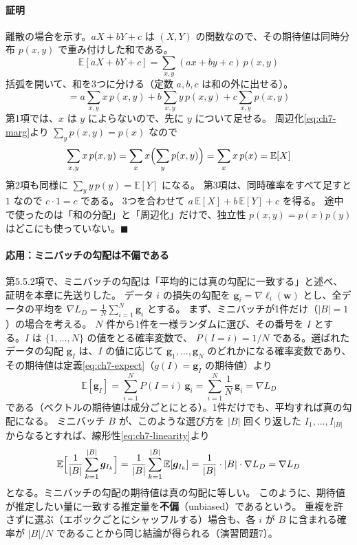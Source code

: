 \paragraph{証明}
離散の場合を示す。$aX + bY + c$ は $(X, Y)$ の関数なので、その期待値は同時分布 $p(x, y)$ で重み付けした和である。
\begin{equation*}
  \mathbb{E}[aX + bY + c] = \sum_{x, y} (ax + by + c)\,p(x, y)
\end{equation*}
括弧を開いて、和を3つに分ける（定数 $a, b, c$ は和の外に出せる）。
\begin{equation*}
  = a \sum_{x, y} x\,p(x, y) + b \sum_{x, y} y\,p(x, y) + c \sum_{x, y} p(x, y)
\end{equation*}
第1項では、$x$ は $y$ によらないので、先に $y$ について足せる。
周辺化\eqref{eq:ch7-marg}より $\sum_y p(x, y) = p(x)$ なので
\begin{equation*}
  \sum_{x, y} x\,p(x, y) = \sum_x x \Bigl( \sum_y p(x, y) \Bigr) = \sum_x x\,p(x) = \mathbb{E}[X]
\end{equation*}
第2項も同様に $\sum_y y\,p(y) = \mathbb{E}[Y]$ になる。
第3項は、同時確率をすべて足すと $1$ なので $c \cdot 1 = c$ である。
3つを合わせて $a\,\mathbb{E}[X] + b\,\mathbb{E}[Y] + c$ を得る。
途中で使ったのは「和の分配」と「周辺化」だけで、独立性 $p(x, y) = p(x)p(y)$ はどこにも使っていない。\hfill $\blacksquare$

\paragraph{応用：ミニバッチの勾配は不偏である}
第5.5.2項で、ミニバッチの勾配は「平均的には真の勾配に一致する」と述べ、証明を本章に先送りした。
データ $i$ の損失の勾配を $\bm{g}_i = \nabla\ell_i(\bm{w})$ とし、全データの平均を $\nabla L_D = \frac{1}{N}\sum_{i=1}^N \bm{g}_i$ とする。
まず、ミニバッチが1件だけ（$|B| = 1$）の場合を考える。
$N$ 件から1件を一様ランダムに選び、その番号を $I$ とする。$I$ は $\{1, \ldots, N\}$ の値をとる確率変数で、
$P(I = i) = 1/N$ である。選ばれたデータの勾配 $\bm{g}_I$ は、$I$ の値に応じて $\bm{g}_1, \ldots, \bm{g}_N$ のどれかになる確率変数であり、
その期待値は定義\eqref{eq:ch7-expect}（$g(I) = \bm{g}_I$ の期待値）より
\begin{equation*}
  \mathbb{E}[\bm{g}_I] = \sum_{i=1}^N P(I = i)\,\bm{g}_i = \sum_{i=1}^N \frac{1}{N}\,\bm{g}_i = \nabla L_D
\end{equation*}
である（ベクトルの期待値は成分ごとにとる）。1件だけでも、平均すれば真の勾配になる。
ミニバッチ $B$ が、このような選び方を $|B|$ 回くり返した $I_1, \ldots, I_{|B|}$ からなるとすれば、線形性\eqref{eq:ch7-linearity}より
\begin{equation}
  \mathbb{E}\Bigl[ \frac{1}{|B|}\sum_{k=1}^{|B|} \bm{g}_{I_k} \Bigr]
  = \frac{1}{|B|}\sum_{k=1}^{|B|} \mathbb{E}[\bm{g}_{I_k}]
  = \frac{1}{|B|} \cdot |B| \cdot \nabla L_D = \nabla L_D
  \label{eq:ch7-sgd-unbiased}
\end{equation}
となる。ミニバッチの勾配の期待値は真の勾配に等しい。
このように、期待値が推定したい量に一致する推定量を\textbf{不偏}（unbiased）であるという。
重複を許さずに選ぶ（エポックごとにシャッフルする）場合も、各 $i$ が $B$ に含まれる確率が $|B|/N$ であることから同じ結論が得られる（演習問題7）。

